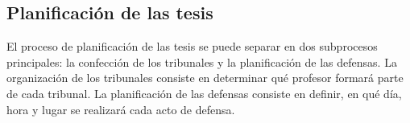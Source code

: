 















\subsection{Planificación de las tesis}
El proceso de planificación de las tesis se puede separar en dos subprocesos principales:
la confección de los tribunales y la planificación de las defensas.
La organización de los tribunales consiste en determinar qué profesor formará parte 
de cada tribunal. La planificación de las defensas consiste en definir, en qué día, hora 
y lugar se realizará cada acto de defensa.

